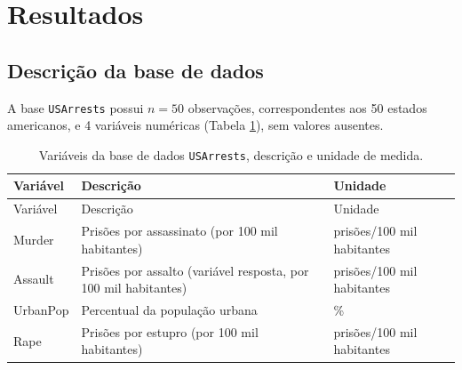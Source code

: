 \documentclass[a4paper]{modeloUFCG} %
\begin{document}
\section{Resultados}\label{resultados}

\subsection{Descrição da base de dados}\label{descriuxe7uxe3o-da-base-de-dados}

A base \texttt{USArrests} possui \(n = 50\) observações, correspondentes aos 50 estados americanos, e 4 variáveis numéricas
(Tabela \ref{tab:variaveis}), sem valores ausentes.

\begin{longtable}[]{@{}
  >{\raggedright\arraybackslash}p{}
  >{\raggedright\arraybackslash}p{}
  >{\raggedright\arraybackslash}p{}@{}}
\caption{\label{tab:variaveis} Variáveis da base de dados \protect\texttt{USArrests}, descrição e unidade de medida.}\tabularnewline
\toprule\noalign{}
\begin{minipage}[b]{\linewidth}\raggedright
Variável
\end{minipage} & \begin{minipage}[b]{\linewidth}\raggedright
Descrição
\end{minipage} & \begin{minipage}[b]{\linewidth}\raggedright
Unidade
\end{minipage} \\
\midrule\noalign{}
\endfirsthead
\toprule\noalign{}
\begin{minipage}[b]{\linewidth}\raggedright
Variável
\end{minipage} & \begin{minipage}[b]{\linewidth}\raggedright
Descrição
\end{minipage} & \begin{minipage}[b]{\linewidth}\raggedright
Unidade
\end{minipage} \\
\midrule\noalign{}
\endhead
\bottomrule\noalign{}
\endlastfoot
Murder & Prisões por assassinato (por 100 mil habitantes) & prisões/100 mil habitantes \\
Assault & Prisões por assalto (variável resposta, por 100 mil habitantes) & prisões/100 mil habitantes \\
UrbanPop & Percentual da população urbana & \% \\
Rape & Prisões por estupro (por 100 mil habitantes) & prisões/100 mil habitantes \\
\end{longtable}
\end{document}
